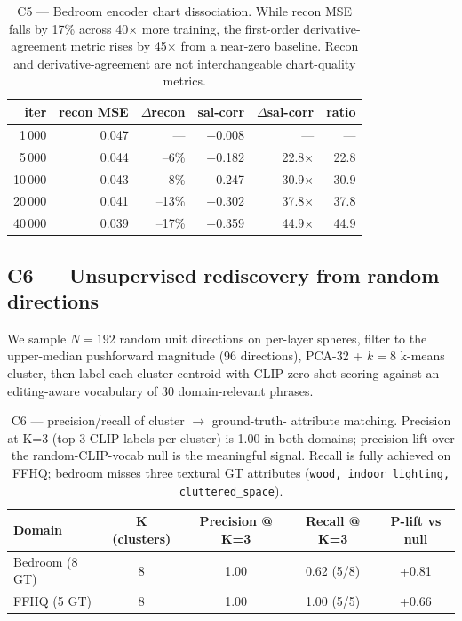 \begin{table}[t]
\centering\small
\begin{tabular}{rrrrrr}
\toprule
iter & recon MSE & $\Delta$recon & sal-corr & $\Delta$sal-corr & ratio \\
\midrule
1\,000   & 0.047 & ---  & +0.008  & ---     & ---   \\
5\,000   & 0.044 & --6\% & +0.182 & 22.8$\times$ & 22.8 \\
10\,000  & 0.043 & --8\% & +0.247 & 30.9$\times$ & 30.9 \\
20\,000  & 0.041 & --13\%& +0.302 & 37.8$\times$ & 37.8 \\
40\,000  & 0.039 & --17\%& +0.359 & 44.9$\times$ & 44.9 \\
\bottomrule
\end{tabular}
\caption{C5 --- Bedroom encoder chart dissociation. While recon MSE
falls by 17\% across 40$\times$ more training, the first-order
derivative-agreement metric rises by 45$\times$ from a near-zero
baseline. Recon and derivative-agreement are not interchangeable
chart-quality metrics. }
\label{tab:c5}
\end{table}

\subsection{C6 --- Unsupervised rediscovery from random directions}
\label{sec:exp-c6}

We sample $N=192$ random unit directions on per-layer spheres,
filter to the upper-median pushforward magnitude (96 directions),
PCA-32 + $k=8$ k-means cluster, then label each cluster centroid with
CLIP zero-shot scoring against an editing-aware vocabulary of 30
domain-relevant phrases.

\begin{table}[t]
\centering\small
\begin{tabular}{lcccc}
\toprule
Domain & K (clusters) & Precision @ K=3 & Recall @ K=3 & P-lift vs null \\
\midrule
Bedroom (8 GT) & 8 & 1.00 & 0.62 (5/8) & +0.81 \\
FFHQ    (5 GT) & 8 & 1.00 & 1.00 (5/5) & +0.66 \\
\bottomrule
\end{tabular}
\caption{C6 --- precision/recall of cluster $\to$ ground-truth-
attribute matching. Precision at K=3 (top-3 CLIP labels per cluster)
is 1.00 in both domains; precision lift over the random-CLIP-vocab
null is the meaningful signal. Recall is fully achieved on FFHQ;
bedroom misses three textural GT attributes
(\texttt{wood, indoor\_lighting, cluttered\_space}).}
\label{tab:c6}
\end{table}


